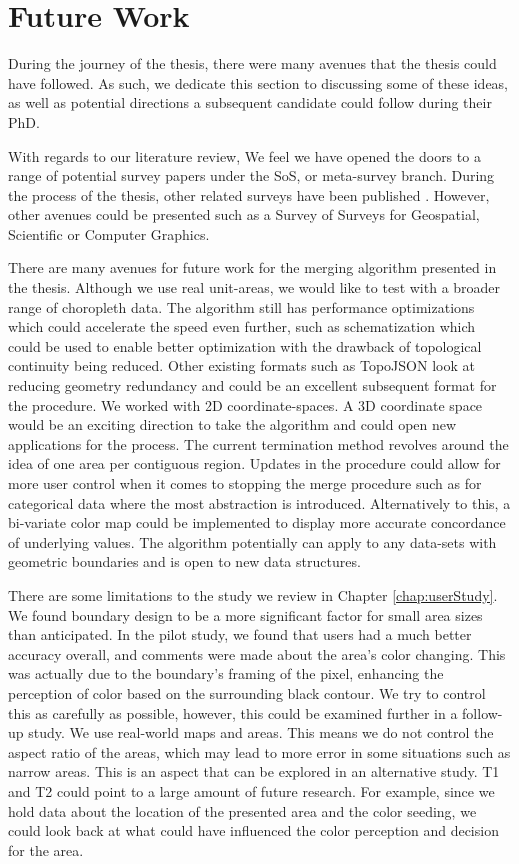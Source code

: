 \section{Future Work}
During the journey of the thesis, there were many avenues that the thesis could have followed. As such, we dedicate this section to discussing some of these ideas, as well as potential directions a subsequent candidate could follow during their PhD.

With regards to our literature review, We feel we have opened the doors to a range of potential survey papers under the SoS, or meta-survey branch. During the process of the thesis, other related surveys have been published \cite{alharbi2017molecular, alharbi2018sos, rees2019survey}. However, other avenues could be presented such as a Survey of Surveys for Geospatial, Scientific or Computer Graphics.

There are many avenues for future work for the merging algorithm presented in the thesis. Although we use real unit-areas, we would like to test with a broader range of choropleth data. The algorithm still has performance optimizations which could accelerate the speed even further, such as schematization \cite{barkowsky2000schematizing} which could be used to enable better optimization with the drawback of topological continuity being reduced. Other existing formats such as TopoJSON \cite{bostock2018topojson} look at reducing geometry redundancy and could be an excellent subsequent format for the procedure. We worked with 2D coordinate-spaces. A 3D coordinate space would be an exciting direction to take the algorithm and could open new applications for the process. The current termination method revolves around the idea of one area per contiguous region. Updates in the procedure could allow for more user control when it comes to stopping the merge procedure such as for categorical data where the most abstraction is introduced. Alternatively to this, a bi-variate color map could be implemented to display more accurate concordance of underlying values.  The algorithm potentially can apply to any data-sets with geometric boundaries and is open to new data structures. 

There are some limitations to the study we review in Chapter \ref{chap:userStudy}. We found boundary design to be a more significant factor for small area sizes than anticipated. In the pilot study, we found that users had a much better accuracy overall, and comments were made about the area's color changing. This was actually due to the boundary's framing of the pixel, enhancing the perception of color based on the surrounding black contour. We try to control this as carefully as possible, however, this could be examined further in a follow-up study. We use real-world maps and areas. This means we do not control the aspect ratio of the areas, which may lead to more error in some situations such as narrow areas. This is an aspect that can be explored in an alternative study. T1 and T2 could point to a large amount of future research. For example, since we hold data about the location of the presented area and the color seeding, we could look back at what could have influenced the color perception and decision for the area.

